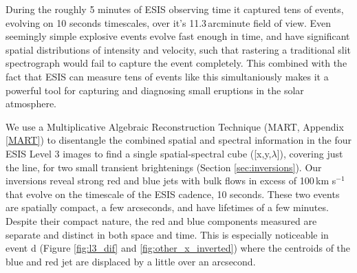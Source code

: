     During the roughly 5 minutes of ESIS observing time it captured tens of events, evolving on 10 seconds timescales, over it's 11.3\,arcminute field of view.
	Even seemingly simple explosive events evolve fast enough in time, and have significant spatial distributions of intensity and velocity, such that rastering a traditional slit spectrograph would fail to capture the event completely. 
	This combined with the fact that ESIS can measure tens of events like this simultaniously makes it a powerful tool for capturing and diagnosing small eruptions in the solar atmosphere.
	
	We use a Multiplicative Algebraic Reconstruction Technique (MART, Appendix \ref{MART}) to disentangle the combined spatial and spectral information in the four ESIS Level 3 images to find a single spatial-spectral cube ([x,y,$\lambda$]), covering just the   line, for two small transient brightenings (Section \ref{sec:inversions}).
	Our inversions reveal strong red and blue jets with bulk flows in excess of 100\,km s$^{-1}$ that evolve on the timescale of the ESIS cadence, 10 seconds.
	These two events are spatially compact, a few arcseconds, and have lifetimes of a few minutes.
	Despite their compact nature, the red and blue components measured are separate and distinct in both space and time. 
	This is especially noticeable in event d (Figure \ref{fig:l3_dif} and \ref{fig:other_x_inverted}) where the centroids of the blue and red jet are displaced by a little over an arcsecond. 
	
